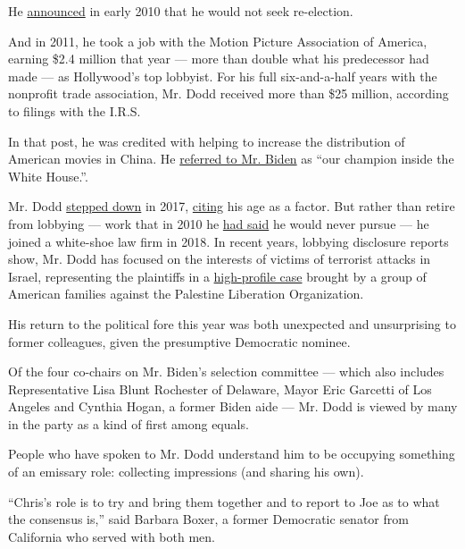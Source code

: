 He
\href{https://www.nytimes.com/2010/01/07/nyregion/07dodd.html}{announced}
in early 2010 that he would not seek re-election.

And in 2011, he took a job with the Motion Picture Association of
America, earning \$2.4 million that year --- more than double what his
predecessor had made --- as Hollywood's top lobbyist. For his full
six-and-a-half years with the nonprofit trade association, Mr. Dodd
received more than \$25 million, according to filings with the I.R.S.

In that post, he was credited with helping to increase the distribution
of American movies in China. He
\href{https://www.latimes.com/politics/story/2019-07-17/joe-biden-money-hollywood-studios-china}{referred
to Mr. Biden} as ``our champion inside the White House.''.

Mr. Dodd
\href{https://www.nytimes.com/2017/04/28/business/media/chris-dodd-resign-mpaa.html}{stepped
down} in 2017,
\href{https://variety.com/2017/film/news/mpaa-shakeup-charles-rivkin-replacing-chris-dodd-1202403340/}{citing}
his age as a factor. But rather than retire from lobbying --- work that
in 2010 he
\href{https://ctmirror.org/2010/08/30/dodd-forswears-lobbying-career/}{had
said} he would never pursue --- he joined a white-shoe law firm in 2018.
In recent years, lobbying disclosure reports show, Mr. Dodd has focused
on the interests of victims of terrorist attacks in Israel, representing
the plaintiffs in a
\href{https://www.nytimes.com/2018/03/19/us/politics/supreme-court-plo-trump-terrorism-case.html}{high-profile
case} brought by a group of American families against the Palestine
Liberation Organization.

His return to the political fore this year was both unexpected and
unsurprising to former colleagues, given the presumptive Democratic
nominee.

Of the four co-chairs on Mr. Biden's selection committee --- which also
includes Representative Lisa Blunt Rochester of Delaware, Mayor Eric
Garcetti of Los Angeles and Cynthia Hogan, a former Biden aide --- Mr.
Dodd is viewed by many in the party as a kind of first among equals.

People who have spoken to Mr. Dodd understand him to be occupying
something of an emissary role: collecting impressions (and sharing his
own).

``Chris's role is to try and bring them together and to report to Joe as
to what the consensus is,'' said Barbara Boxer, a former Democratic
senator from California who served with both men.

